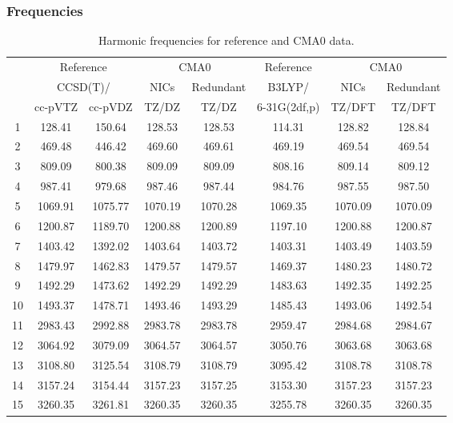\documentclass[10pt,oneside]{article}
\begin{document}
\begin{table}[h!]
\subsubsection*{Frequencies}
\centering
\caption{Harmonic frequencies for reference and CMA0 data.}
\begin{tabular}{cccccccc}
\toprule
{} & \multicolumn{2}{c}{Reference} & \multicolumn{2}{c}{CMA0} &    Reference & \multicolumn{2}{c}{CMA0} \\
{} & \multicolumn{2}{c}{CCSD(T)/} &    NICs &  Redundant &       B3LYP/ &    NICs & Redundant \\
{} &   cc-pVTZ & cc-pVDZ &   TZ/DZ &      TZ/DZ & 6-31G(2df,p) &  TZ/DFT &    TZ/DFT \\
\midrule
1  &    128.41 &  150.64 &  128.53 &     128.53 &       114.31 &  128.82 &    128.84 \\
2  &    469.48 &  446.42 &  469.60 &     469.61 &       469.19 &  469.54 &    469.54 \\
3  &    809.09 &  800.38 &  809.09 &     809.09 &       808.16 &  809.14 &    809.12 \\
4  &    987.41 &  979.68 &  987.46 &     987.44 &       984.76 &  987.55 &    987.50 \\
5  &   1069.91 & 1075.77 & 1070.19 &    1070.28 &      1069.35 & 1070.09 &   1070.09 \\
6  &   1200.87 & 1189.70 & 1200.88 &    1200.89 &      1197.10 & 1200.88 &   1200.87 \\
7  &   1403.42 & 1392.02 & 1403.64 &    1403.72 &      1403.31 & 1403.49 &   1403.59 \\
8  &   1479.97 & 1462.83 & 1479.57 &    1479.57 &      1469.37 & 1480.23 &   1480.72 \\
9  &   1492.29 & 1473.62 & 1492.29 &    1492.29 &      1483.63 & 1492.35 &   1492.25 \\
10 &   1493.37 & 1478.71 & 1493.46 &    1493.29 &      1485.43 & 1493.06 &   1492.54 \\
11 &   2983.43 & 2992.88 & 2983.78 &    2983.78 &      2959.47 & 2984.68 &   2984.67 \\
12 &   3064.92 & 3079.09 & 3064.57 &    3064.57 &      3050.76 & 3063.68 &   3063.68 \\
13 &   3108.80 & 3125.54 & 3108.79 &    3108.79 &      3095.42 & 3108.78 &   3108.78 \\
14 &   3157.24 & 3154.44 & 3157.23 &    3157.25 &      3153.30 & 3157.23 &   3157.23 \\
15 &   3260.35 & 3261.81 & 3260.35 &    3260.35 &      3255.78 & 3260.35 &   3260.35 \\
\bottomrule
\end{tabular}
\end{table}
\end{document}
